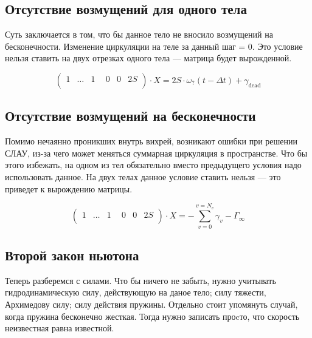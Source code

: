 \documentclass[14pt]{extreport}
\begin{document}
\subsection{Отсутствие возмущений для одного тела}

Суть заключается в том, что бы данное тело не вносило возмущений на бесконечности.
Изменение циркуляции на теле за данный шаг = 0. Это условие нельзя ставить на двух отрезках одного тела --- матрица будет вырожденной.

\begin{equation*}
\left(\begin{matrix}
1& \dotsc& 1& ~~0& 0& 2S\\
\end{matrix}\right)
\cdot X = 2S \cdot \omega_?(t-\Delta t) + \gamma_\text{dead}
\end{equation*}

\subsection{Отсутствие возмущений на бесконечности}

Помимо нечаянно проникших внутрь вихрей, возникают ошибки при решении СЛАУ, из-за чего может меняться суммарная циркуляция в пространстве.
Что бы этого избежать, на одном из тел обязательно вместо предыдущего условия надо использовать данное. На двух телах данное условие ставить нельзя --- это приведет к вырождению матрицы.

\begin{equation*}
\left(\begin{matrix}
1& \dotsc& 1& ~~0& 0& 2S\\
\end{matrix}\right)
\cdot X = -\sum\limits_{v=0}^{v=N_v} \gamma_v - \Gamma_\infty
\end{equation*}

\subsection{Второй закон ньютона}

Теперь разберемся с силами. Что бы ничего не забыть, нужно учитывать гидродинамическую силу, действующую на даное тело; силу тяжести, Архимедову силу; силу действия пружины. Отдельно стоит упомянуть случай, когда пружина бесконечно жесткая. Тогда нужно записать проcто, что скорость неизвестная равна известной.
\end{document}
